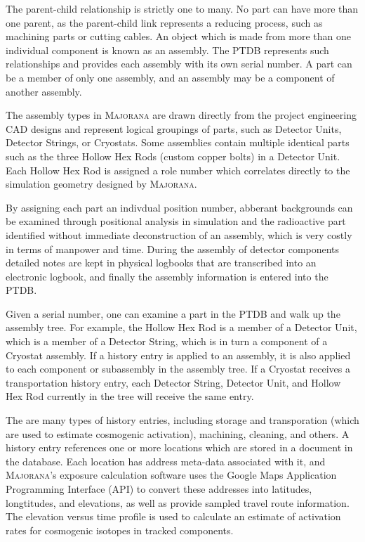 \documentclass[journal]{IEEEtran}
\begin{document}
The parent-child relationship is strictly one to many. No part can have more than one parent, as the parent-child link
represents a reducing process, such as machining parts or cutting cables. An object which is made from more than one individual
component is known as an assembly. The PTDB represents such relationships and provides each assembly with its own serial number. A part can be a member of only one assembly,
and an assembly may be a component of another assembly.

The assembly types in \textsc{Majorana} are drawn directly from the project engineering CAD designs and represent logical 
groupings of parts, such as Detector Units, Detector Strings, or Cryostats. 
Some assemblies contain multiple identical parts such as the three Hollow Hex Rods (custom copper bolts) in a Detector Unit.
Each Hollow Hex Rod is assigned a role number which correlates directly to the simulation geometry designed by \textsc{Majorana}. 

By assigning each part an indivdual position number, abberant backgrounds can be examined through positional analysis in 
simulation and the radioactive part identified without immediate deconstruction of an assembly, which is very costly in 
terms of manpower and time. During the assembly of detector components detailed notes are kept in physical logbooks that are
transcribed into an electronic logbook, and finally the assembly information is entered into the PTDB.

Given a serial number, one can examine a part in the PTDB and walk up the assembly tree. For example, the Hollow Hex Rod is a member
of a Detector Unit, which is a member of a Detector String, which is in turn a component of a Cryostat assembly.
If a history entry is applied to an assembly, it is also applied to each component or sub\-assembly in the assembly tree. If a Cryostat receives
a transportation history entry, each Detector String, Detector Unit, and Hollow Hex Rod currently in the tree will receive the same entry.

The are many types of history entries, including storage and transporation (which are used to estimate cosmogenic activation), machining, cleaning,
and others. A history entry references one or more locations which are stored in a document in the database. Each location has address meta-data
associated with it, and \textsc{Majorana}'s exposure calculation software uses the 
Google Maps Application Programming Interface (API) \cite{google_maps_dev_guide} to convert these addresses into latitudes, longtitudes, and elevations,
as well as provide sampled travel route information. The elevation versus time
profile is used to calculate an estimate of activation rates for cosmogenic isotopes in tracked components.
\end{document}
